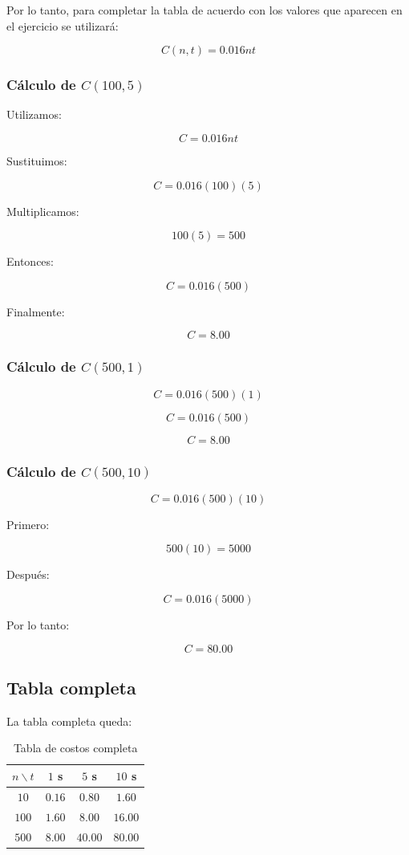 \documentclass[12pt,a4paper]{article}
\begin{document}
Por lo tanto, para completar la tabla de acuerdo con los valores
que aparecen en el ejercicio se utilizará:

\[\boxed{C(n,t)=0.016nt}\]

\subsubsection{Cálculo de $C(100,5)$}

Utilizamos:

\[C=0.016nt\]

Sustituimos:

\[C=0.016(100)(5)\]

Multiplicamos:

\[100(5)=500\]

Entonces:

\[C=0.016(500)\]

Finalmente:

\[\boxed{C=8.00}\]

\subsubsection{Cálculo de $C(500,1)$}

\[C=0.016(500)(1)\]

\[C=0.016(500)\]

\[\boxed{C=8.00}\]


\subsubsection{Cálculo de $C(500,10)$}

\[C=0.016(500)(10)\]

Primero:

\[500(10)=5000\]

Después:

\[C=0.016(5000)\]

Por lo tanto:

\[\boxed{C=80.00}\]


\subsection{Tabla completa}

La tabla completa queda:

\begin{table}[H]
\centering
\caption{Tabla de costos completa}
\begin{tabular}{c|ccc}
\toprule
$n\backslash t$ & $1$ s & $5$ s & $10$ s\\
\midrule
$10$  & $0.16$ & $0.80$ & $1.60$\\
$100$ & $1.60$ & $8.00$ & $16.00$\\
$500$ & $8.00$ & $40.00$ & $80.00$\\
\bottomrule
\end{tabular}
\end{table}
\end{document}

